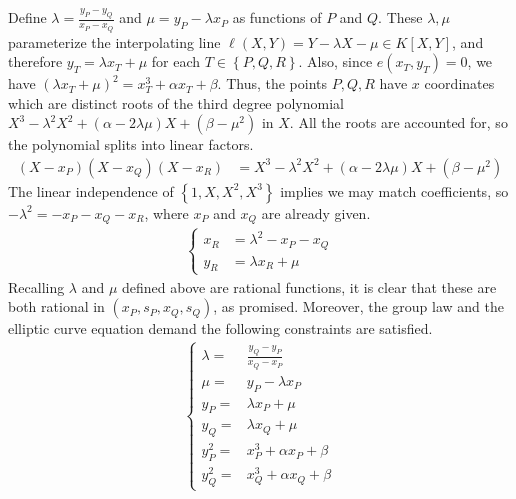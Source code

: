 \documentclass[11pt,letterpaper]{article}
\theoremstyle{definition}
\newcommand{\6}{\mathbf}
\newcommand{\7}{\mathcal}
\begin{document}
Define $\lambda = \frac{y_P - y_Q}{x_P - x_Q}$ and $\mu = y_P - \lambda x_P$ as functions of $P$ and $Q$.
These $\lambda, \mu$ parameterize the interpolating line $\ell(X,Y) = Y - \lambda X - \mu \in K[X,Y]$, and therefore $y_T = \lambda x_T + \mu$ for each $T \in \left\{P, Q, R\right\}$.  Also, since $e(x_T, y_T) = 0$, we have $(\lambda x_T + \mu)^2 = x_T^3 + \alpha x_T + \beta$. Thus, the points $P, Q, R$ have $x$ coordinates which are distinct roots of the third degree polynomial $X^3 - \lambda^2 X^2 + (\alpha - 2\lambda \mu)X + (\beta - \mu^2)$ in $X$.
All the roots are accounted for, so the polynomial splits into linear factors. 
\begin{align*}
(X-x_P)(X-x_Q)(X-x_R) &= X^3 - \lambda^2 X^2 + (\alpha - 2\lambda \mu)X + (\beta - \mu^2) 
\end{align*}
The linear independence of $\left\{1,X,X^2,X^3\right\}$ implies we may match coefficients, so $-\lambda^2 = -x_P - x_Q - x_R$, where $x_P$ and $x_Q$ are already given. 
\begin{align*}
\begin{cases}
x_R &= \lambda^2 - x_P - x_Q \\ 
y_R &= \lambda x_R + \mu
\end{cases}
\end{align*}
Recalling $\lambda$ and $\mu$ defined above are rational functions, it is clear that these are both rational in $(x_P, s_P, x_Q, s_Q)$, as promised. 
Moreover, the group law and the elliptic curve equation demand the following constraints are satisfied.
\begin{align}
\begin{cases} 
\lambda =& \frac{y_Q-y_P}{x_Q-x_P} \\
\mu =& y_P - \lambda x_P \\
y_P =& \lambda x_P + \mu\\
y_Q =& \lambda x_Q + \mu\\
y_P^2 =& x_P^3 + \alpha x_P + \beta \\
y_Q^2 =& x_Q^3 + \alpha x_Q + \beta
\label{thesystem}
\end{cases}
\end{align}
\end{document}
